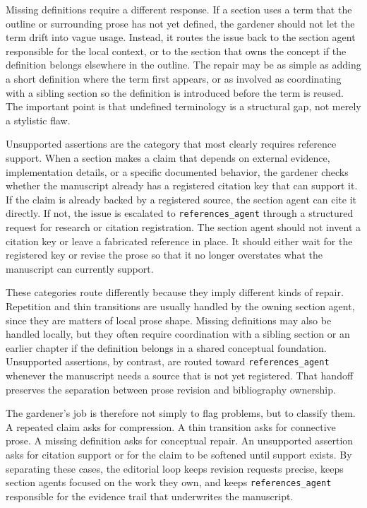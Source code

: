 \documentclass[11pt]{article}
\begin{document}
Missing definitions require a different response. If a section uses a term that the outline or surrounding prose has not yet defined, the gardener should not let the term drift into vague usage. Instead, it routes the issue back to the section agent responsible for the local context, or to the section that owns the concept if the definition belongs elsewhere in the outline. The repair may be as simple as adding a short definition where the term first appears, or as involved as coordinating with a sibling section so the definition is introduced before the term is reused. The important point is that undefined terminology is a structural gap, not merely a stylistic flaw.

Unsupported assertions are the category that most clearly requires reference support. When a section makes a claim that depends on external evidence, implementation details, or a specific documented behavior, the gardener checks whether the manuscript already has a registered citation key that can support it. If the claim is already backed by a registered source, the section agent can cite it directly. If not, the issue is escalated to \texttt{references\_agent} through a structured request for research or citation registration. The section agent should not invent a citation key or leave a fabricated reference in place. It should either wait for the registered key or revise the prose so that it no longer overstates what the manuscript can currently support.

These categories route differently because they imply different kinds of repair. Repetition and thin transitions are usually handled by the owning section agent, since they are matters of local prose shape. Missing definitions may also be handled locally, but they often require coordination with a sibling section or an earlier chapter if the definition belongs in a shared conceptual foundation. Unsupported assertions, by contrast, are routed toward \texttt{references\_agent} whenever the manuscript needs a source that is not yet registered. That handoff preserves the separation between prose revision and bibliography ownership.

The gardener's job is therefore not simply to flag problems, but to classify them. A repeated claim asks for compression. A thin transition asks for connective prose. A missing definition asks for conceptual repair. An unsupported assertion asks for citation support or for the claim to be softened until support exists. By separating these cases, the editorial loop keeps revision requests precise, keeps section agents focused on the work they own, and keeps \texttt{references\_agent} responsible for the evidence trail that underwrites the manuscript.
\end{document}

